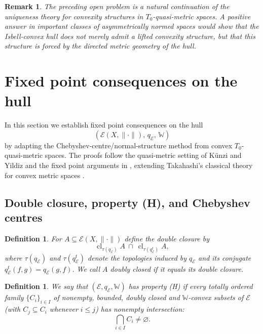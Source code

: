 \documentclass[preprint,12pt]{elsarticle}
\numberwithin{equation}{section}
\newtheorem{definition}[theorem]{Definition}
\newtheorem{remark}[theorem]{Remark}
\newcommand{\E}{\mathcal{E}}
\newcommand{\cl}{\operatorname{cl}}
\begin{document}
\begin{remark}\label{rem:unique-programme}
The preceding open problem is a natural continuation of the uniqueness theory
for convexity structures in \(T_0\)-quasi-metric spaces.  A positive answer in
important classes of asymmetrically normed spaces would show that the
Isbell-convex hull does not merely admit a lifted convexity structure, but
that this structure is forced by the directed metric geometry of the hull.
\end{remark}





\section{Fixed point consequences on the hull}\label{sec:fixhull}

In this section we establish fixed point consequences on the hull
\[
(\E(X,\|\cdot\|),\,q_{\E},\,\mathbb{W})
\]
by adapting the Chebyshev-centre/normal-structure method from convex $T_{0}$-quasi-metric spaces.
The proofs follow the quasi-metric setting of K\"unzi and Yildiz \cite{KunziYildiz2016} and the
fixed point arguments in \cite{Olela2015,OlelaZweni2023}, extending Takahashi's classical theory
for convex metric spaces \cite{Takahashi1970}.

\subsection{Double closure, property (H), and Chebyshev centres}

\begin{definition}\label{def:doubleclosureHull}
For $A\subseteq \E(X,\|\cdot\|)$ define the \emph{double closure} by
\[
\cl_{\tau(q_{\E})}A\ \cap\ \cl_{\tau(q_{\E}^{t})}A,
\]
where $\tau(q_{\E})$ and $\tau(q_{\E}^{t})$ denote the topologies induced by $q_{\E}$ and its
conjugate $q_{\E}^{t}(f,g)=q_{\E}(g,f)$. We call $A$ \emph{doubly closed} if it equals its
double closure.
\end{definition}

\begin{definition}\label{def:Hhull}
We say that $(\E,q_{\E},\mathbb{W})$ has \emph{property {\rm(H)}} if every totally ordered family
$\{C_{i}\}_{i\in I}$ of nonempty, bounded, doubly closed and $\mathbb{W}$-convex subsets of $\E$
(with $C_{j}\subseteq C_{i}$ whenever $i\le j$) has nonempty intersection:
\[
\bigcap_{i\in I} C_{i}\neq\varnothing.
\]
\end{definition}
\end{document}
